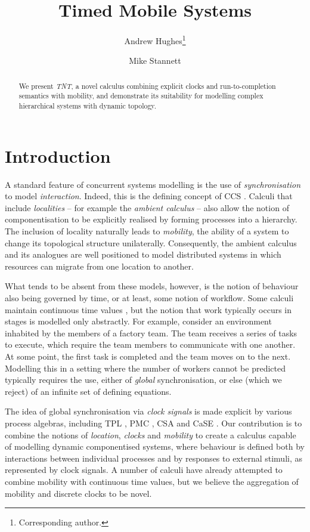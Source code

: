 \documentclass[orivec,envcountsame]{llncs}
\title{Timed Mobile Systems}
\author{Andrew Hughes\thanks{Corresponding author.} \and Mike Stannett}
\institute{Department of Computer Science, University of Sheffield, \\
  Regent Court, 211 Portobello Street, Sheffield S1 4DP, UK. \\
  \email{\{a.hughes,~m.stannett\}@dcs.shef.ac.uk}
}
\begin{document}
\maketitle

\begin{abstract}

We present \emph{TNT}, a novel calculus combining explicit clocks and
run-to-completion semantics with mobility, and demonstrate its
suitability for modelling complex hierarchical systems with dynamic
topology.

\end{abstract}

\section{Introduction}
\label{introduction}

A standard feature of concurrent systems modelling is the use of
\emph{synchronisation} to model \emph{interaction}. Indeed, this is the
defining concept of CCS \cite{milner:ccs}. Calculi that include
\emph{localities} -- for example the \emph{ambient calculus} \cite{amb}
-- also allow the notion of componentisation to be explicitly realised
by forming processes into a hierarchy. The inclusion of locality
naturally leads to \emph{mobility}, the ability of a system to change
its topological structure unilaterally. Consequently, the ambient
calculus and its analogues are well positioned to model distributed
systems in which resources can migrate from one location to another.

What tends to be absent from these models, however, is the notion of
behaviour also being governed by time, or at least, some notion of
workflow. Some calculi maintain continuous time values
\cite{tccs,beaten:timing,brics:lee}, but the notion that work typically
occurs in stages is modelled only abstractly. For example, consider an
environment inhabited by the members of a factory team. The team
receives a series of tasks to execute, which require the team members to
communicate with one another. At some point, the first task is completed
and the team moves on to the next. Modelling this in a setting where the
number of workers cannot be predicted typically requires the use, either
of \emph{global} synchronisation, or else (which we reject) of an
infinite set of defining equations.

The idea of global synchronisation via \emph{clock signals} is made explicit by
various process algebras, including TPL \cite{hennessy:tpl}, PMC
\cite{pmc}, CSA \cite{csa} and CaSE \cite{case,norton05alg}. Our contribution is
to combine the notions of \emph{location}, \emph{clocks} and \emph{mobility} to
create a calculus capable of modelling dynamic componentised systems, where
behaviour is defined both by interactions between individual processes and by
responses to external stimuli, as represented by clock signals. A number of
calculi \cite{lee:realtime,satoh:phd,webpi} have already attempted to combine
mobility with continuous time values, but we believe the aggregation
of mobility and discrete clocks to be novel.
\end{document}

